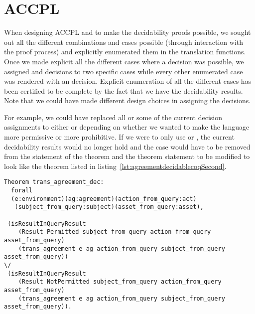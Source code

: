 \section{ACCPL}

When designing \ac{ACCPL} and to make the decidability proofs possible, we sought out all the different combinations and cases possible (through interaction with the proof process) and explicitly enumerated them in the translation functions. Once we made explicit all the different cases where a decision was possible, we assigned  and  decisions to two specific cases while every other enumerated case was rendered with an  decision. Explicit enumeration of all the different cases has been certified to be complete by the fact that we have the decidability results. Note that we could have made different design choices in assigning the decisions. 

For example, we could have replaced all or some of the current  decision assignments to either  or  depending on whether we wanted to make the language more permissive or more prohibitive. If we were to only use  or , the current decidability results would no longer hold and the  case would have to be removed from the statement of the theorem and the theorem statement to be modified to look like the theorem listed in listing~\ref{lst:agreementdecidablecoqSecond}.

\begin{minipage}[c]{0.95\textwidth}
\begin{lstlisting}
Theorem trans_agreement_dec:
  forall
  (e:environment)(ag:agreement)(action_from_query:act)
   (subject_from_query:subject)(asset_from_query:asset),

 (isResultInQueryResult 
    (Result Permitted subject_from_query action_from_query asset_from_query)
    (trans_agreement e ag action_from_query subject_from_query asset_from_query)) 
\/
 (isResultInQueryResult 
    (Result NotPermitted subject_from_query action_from_query asset_from_query)
    (trans_agreement e ag action_from_query subject_from_query asset_from_query)).

\end{lstlisting}
\end{minipage}



